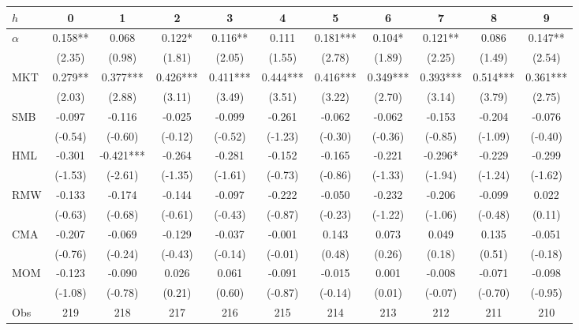 \begin{tabular}{lcccccccccc}
\toprule
$h$ & 0 & 1 & 2 & 3 & 4 & 5 & 6 & 7 & 8 & 9 \\
\midrule
$\alpha$ & 0.158** & 0.068 & 0.122* & 0.116** & 0.111 & 0.181*** & 0.104* & 0.121** & 0.086 & 0.147** \\
 & (2.35) & (0.98) & (1.81) & (2.05) & (1.55) & (2.78) & (1.89) & (2.25) & (1.49) & (2.54) \\
MKT & 0.279** & 0.377*** & 0.426*** & 0.411*** & 0.444*** & 0.416*** & 0.349*** & 0.393*** & 0.514*** & 0.361*** \\
 & (2.03) & (2.88) & (3.11) & (3.49) & (3.51) & (3.22) & (2.70) & (3.14) & (3.79) & (2.75) \\
SMB & -0.097 & -0.116 & -0.025 & -0.099 & -0.261 & -0.062 & -0.062 & -0.153 & -0.204 & -0.076 \\
 & (-0.54) & (-0.60) & (-0.12) & (-0.52) & (-1.23) & (-0.30) & (-0.36) & (-0.85) & (-1.09) & (-0.40) \\
HML & -0.301 & -0.421*** & -0.264 & -0.281 & -0.152 & -0.165 & -0.221 & -0.296* & -0.229 & -0.299 \\
 & (-1.53) & (-2.61) & (-1.35) & (-1.61) & (-0.73) & (-0.86) & (-1.33) & (-1.94) & (-1.24) & (-1.62) \\
RMW & -0.133 & -0.174 & -0.144 & -0.097 & -0.222 & -0.050 & -0.232 & -0.206 & -0.099 & 0.022 \\
 & (-0.63) & (-0.68) & (-0.61) & (-0.43) & (-0.87) & (-0.23) & (-1.22) & (-1.06) & (-0.48) & (0.11) \\
CMA & -0.207 & -0.069 & -0.129 & -0.037 & -0.001 & 0.143 & 0.073 & 0.049 & 0.135 & -0.051 \\
 & (-0.76) & (-0.24) & (-0.43) & (-0.14) & (-0.01) & (0.48) & (0.26) & (0.18) & (0.51) & (-0.18) \\
MOM & -0.123 & -0.090 & 0.026 & 0.061 & -0.091 & -0.015 & 0.001 & -0.008 & -0.071 & -0.098 \\
 & (-1.08) & (-0.78) & (0.21) & (0.60) & (-0.87) & (-0.14) & (0.01) & (-0.07) & (-0.70) & (-0.95) \\
Obs & 219 & 218 & 217 & 216 & 215 & 214 & 213 & 212 & 211 & 210 \\
\bottomrule
\end{tabular}

